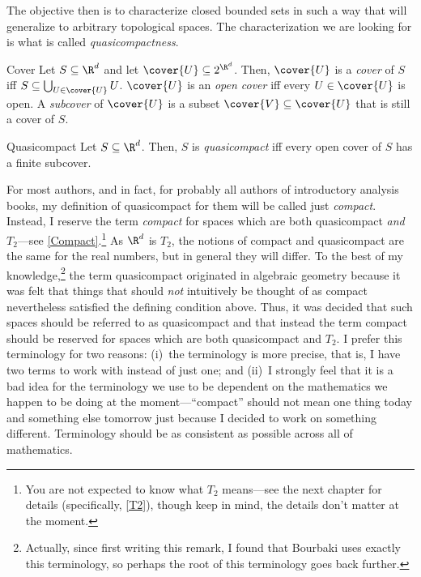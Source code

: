 The objective then is to characterize closed bounded sets in such a way that will generalize to arbitrary topological spaces.  The  characterization we are looking for is what is called \emph{quasicompactness}.
\begin{dfn}{Cover}{}
Let $S\subseteq \R ^d$ and let $\cover{U}\subseteq 2^{\R ^d}$.  Then, $\cover{U}$ is a \emph{cover} of $S$ iff $S\subseteq \bigcup _{U\in \cover{U}}U$.  $\cover{U}$ is an \emph{open cover} iff every $U\in \cover{U}$ is open.  A \emph{subcover} of $\cover{U}$ is a subset $\cover{V}\subseteq \cover{U}$ that is still a cover of $S$.
\end{dfn}
\begin{dfn}{Quasicompact}{}
Let $S\subseteq \R ^d$.  Then, $S$ is \emph{quasicompact} iff every open cover of $S$ has a finite subcover.
\begin{rmk}
For most authors, and in fact, for probably all authors of introductory analysis books, my definition of quasicompact for them will be called just \emph{compact}.  Instead, I reserve the term \emph{compact} for spaces which are both quasicompact \emph{and} $T_2$---see \cref{Compact}.\footnote{You are not expected to know what $T_2$ means---see the next chapter for details (specifically, \cref{T2}), though keep in mind, the details don't matter at the moment.}  As $\R ^d$ is $T_2$, the notions of compact and quasicompact are the same for the real numbers, but in general they will differ.  To the best of my knowledge,\footnote{Actually, since first writing this remark, I found that Bourbaki \cite[pg.~83]{Bourbaki} uses exactly this terminology, so perhaps the root of this terminology goes back further.} the term quasicompact originated in algebraic geometry because it was felt that things that should \emph{not} intuitively be thought of as compact nevertheless satisfied the defining condition above.  Thus, it was decided that such spaces should be referred to as quasicompact and that instead the term compact should be reserved for spaces which are both quasicompact and $T_2$.  I prefer this terminology for two reasons:  (i)~the terminology is more precise, that is, I have two terms to work with instead of just one; and (ii)~I strongly feel that it is a bad idea for the terminology we use to be dependent on the mathematics we happen to be doing at the moment---``compact'' should not mean one thing today and something else tomorrow just because I decided to work on something different.  Terminology should be as consistent as possible across all of mathematics.
\end{rmk}
\end{dfn}

